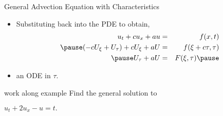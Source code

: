 \documentclass[t,10pt,fleqn]{beamer}
\begin{document}
\begin{frame}{}
\begin{block}{General Advection Equation with Characteristics}
\begin{itemize}
     \pause
     \item Substituting back into the PDE to obtain, 
    \begin{eqnarray*} 
            u_t + c u_x +au & =  &  f(x,t)   \\ \pause
         ( -c U_{\xi}   + U_{\tau} ) + c U_{\xi}   + a U     & =  & f(\xi+c\tau, \tau)    \\ \pause
               U_{\tau} + a U  & =  & F(\xi,\tau)   \pause
      \end{eqnarray*}
   \item an ODE in $\tau$. 

        \end{itemize} 
 
 
\end{block}
 
 
 \end{frame}
\begin{frame}

\begin{block}{work along example}
  Find the general solution to 
  \begin{center}
          $u_t+2u_x-u=t.$
  \end{center}
\end{block}

\end{frame}
\end{document}
